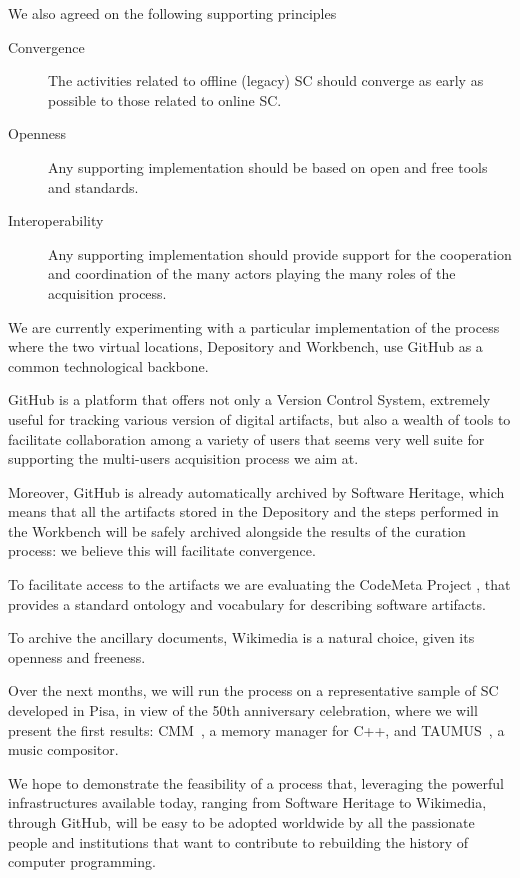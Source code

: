 \documentclass[a4paper]{article}
\begin{document}
We also agreed on the following supporting principles

\begin{description}
	\item[Convergence] The activities related to offline (legacy) SC should converge as early as possible to those related to online SC.
	\item[Openness] Any supporting implementation should be 
	based on open and free tools and standards.
	\item[Interoperability] Any supporting implementation should provide support for 
the cooperation and coordination of the many actors playing the many roles of the acquisition process.	
\end{description}

\noindent
We are currently experimenting with a particular implementation of the process where the two virtual locations, Depository and Workbench, use GitHub as a common technological backbone.

GitHub is a platform that offers not only a Version Control System, extremely
useful for tracking various version of digital artifacts, but also a wealth of
tools to facilitate collaboration among a variety of users that seems very well
suite for supporting the multi-users acquisition process we aim at.

Moreover, GitHub is already automatically archived by Software Heritage, which
means that all the artifacts stored in the Depository and the steps performed in
the Workbench will be safely archived alongside the results of the curation process:
we believe this will facilitate convergence.

To facilitate access to the artifacts we are evaluating the CodeMeta Project \cite{CodeMeta}, that provides a standard ontology and vocabulary for describing software artifacts.

\noindent
To archive the ancillary documents, Wikimedia \cite{wiki:Wikimedia_movement} is a natural choice, given its openness and freeness.  


Over the next months, we will run the process on a representative sample of SC
developed in Pisa, in view of the 50th anniversary celebration, where we will
present the first results: CMM~\cite{Attardi1998}, a memory manager for C++, and TAUMUS~\cite{NenciniGBCT86}, a music compositor.  


We hope to demonstrate the feasibility of a process that, leveraging the
powerful infrastructures available today, ranging from Software Heritage to
Wikimedia, through GitHub, will be easy to be adopted worldwide by all the
passionate people and institutions that want to contribute to rebuilding
the history of computer programming.
\end{document}
